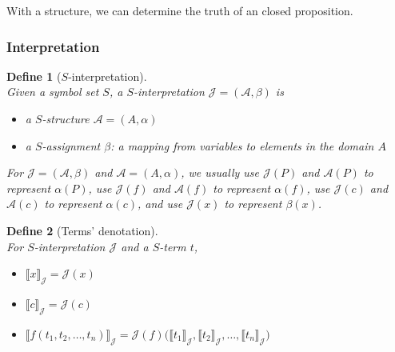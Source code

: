 \documentclass{ctexart}
\newcommand{\。}{．} %
\newenvironment{lvse}{
    \begin{tcolorbox}[enhanced, colback=qlv, boxrule=0pt, frame hidden,
        borderline west={0.7mm}{0.1mm}{slv}]
    }
    {\end{tcolorbox}}
\theoremstyle{t} %
\newtheorem{dyhj}{\color{slv} Define}[subsection] %
\newenvironment{dy}{\begin{lvse}\begin{dyhj}}{\end{dyhj}\end{lvse}}
\begin{document}
With a structure, we can determine the truth of an closed proposition.

\subsubsection{Interpretation}

\begin{dy}[$S$-interpretation]\quad \\
    Given a symbol set $S$, a $S$-interpretation $\mathcal{J} = (\mathcal{A}, \beta)$ is
    \begin{itemize}
        \item a \( S \)-structure \( \mathcal{A} = (A, \alpha) \)
        \item a \( S \)-assignment \( \beta \): a mapping from variables to elements in the domain \( A \)
    \end{itemize}
        
    For \( \mathcal{J} = (\mathcal{A}, \beta) \) and \( \mathcal{A} = (A, \alpha) \), we usually use \( \mathcal{J}(P) \) and \( \mathcal{A}(P) \) to represent \( \alpha(P) \), use \( \mathcal{J}(f) \) and \( \mathcal{A}(f) \) to represent \( \alpha(f) \), use \( \mathcal{J}(c) \) and \( \mathcal{A}(c) \) to represent \( \alpha(c) \), and use \( \mathcal{J}(x) \) to represent \( \beta(x) \).        
\end{dy}

\begin{dy}[Terms' denotation]\quad \\
    For $S$-interpretation $\mathcal{J}$ and a $S$-term $t$,
    \begin{itemize}
        \item $\llbracket x \rrbracket_{\mathcal{J}} = \mathcal{J}(x)$
        \item $\llbracket c \rrbracket_{\mathcal{J}} = \mathcal{J}(c)$
        \item $\llbracket f(t_1, t_2, \dots, t_n) \rrbracket_{\mathcal{J}} = \mathcal{J}(f) \big( \llbracket t_1 \rrbracket_{\mathcal{J}}, \llbracket t_2 \rrbracket_{\mathcal{J}}, \dots, \llbracket t_n \rrbracket_{\mathcal{J}} \big)$
    \end{itemize}
\end{dy}
\end{document}

